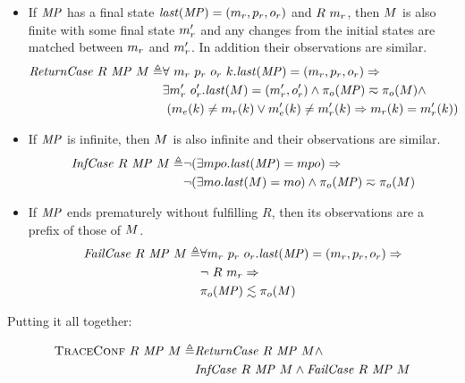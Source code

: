 \documentclass[acmsmall,review,anonymous]{acmart}\settopmatter{printfolios=true,printccs=false,printacmref=false}
\begin{document}
\begin{itemize}
  \item If \(\mathit{MP}\) has a final state \(\mathit{last}(\mathit{MP}) = (m_r,p_r,o_r)\) and \(R\ \mach_r\), then \(M\) is also finite with
    some final state \(m_r'\) and any changes from the initial states are
    matched between \(m_r\) and \(m_r'\). In addition their
    observations are similar.
    \[\begin{split}
      \mathit{ReturnCase} ~ R ~ \mathit{MP} ~ M \triangleq &
      \forall ~ m_r ~ p_r ~ o_r ~ k . \mathit{last}(\mathit{MP}) =
        (m_r,p_r,o_r) \Rightarrow \\
      & \exists m_r' ~ o_r' . \mathit{last}(M) = (m_r',o_r')
        \land \pi_o(\mathit{MP}) \eqsim \pi_o(M) \land \\
      & ~ (m_e(k) \not = m_r(k)
        \lor m_e'(k) \not = m_r'(k) \Rightarrow
      m_r(k) = m_r'(k))
    \end{split}\]
  \item If \(\mathit{MP}\) is infinite, then \(M\) is also infinite and their
  observations are similar.
    \[\begin{split}
      \mathit{InfCase} ~ R ~ \mathit{MP} ~ M \triangleq
      & \neg (\exists mpo . \mathit{last}(\mathit{MP}) = mpo) \Rightarrow \\
      & \neg (\exists mo . \mathit{last}(M) = mo)
        \land \pi_o(\mathit{MP}) \eqsim \pi_o(M)
    \end{split}\]
\item If \(\mathit{MP}\) ends prematurely without fulfilling \(R\), then
  its observations are a prefix of those of \(M\).
    \[\begin{split}
      \mathit{FailCase} ~ R ~ \mathit{MP} ~ M \triangleq
      & \forall m_r ~ p_r ~ o_r .
        \mathit{last}(\mathit{MP}) = (m_r,p_r,o_r) \Rightarrow \\
      & \neg ~ R ~ m_r \Rightarrow \\
      & \pi_o(\mathit{MP}) \lesssim \pi_o(M)
    \end{split}\]
\end{itemize}

Putting it all together:

\[\begin{split}
  \text{\sc TraceConf} ~ R ~ \mathit{MP} ~ M \triangleq
  & \mathit{ReturnCase} ~ R ~ \mathit{MP} ~ M \land \\
  & \mathit{InfCase} ~ R ~ \mathit{MP} ~ M \land
    \mathit{FailCase} ~ R ~ \mathit{MP} ~ M \\
\end{split}\]
\end{document}
